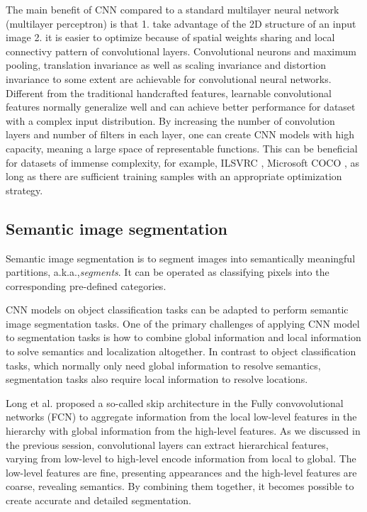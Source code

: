 
The main benefit of CNN compared to a standard multilayer neural network (multilayer perceptron) is that
1. take advantage of the 2D structure of an input image
2. it is easier to optimize because of spatial weights sharing and local connectivy pattern of convolutional layers.
Convolutional neurons and maximum pooling, translation invariance as well as scaling invariance and distortion invariance to some extent are achievable for convolutional neural networks. \cite{lecun1998gradient}
Different from the traditional handcrafted features, learnable convolutional features normally generalize well and can achieve better performance for dataset with a complex input distribution. \cite{krizhevsky2012imagenet}
By increasing the number of convolution layers and number of filters in each layer, one can create CNN models with high capacity, meaning a large space of representable functions.
This can be beneficial for datasets of immense complexity, for example, ILSVRC \cite{russakovsky2015imagenet}, Microsoft COCO \cite{lin2014microsoft}, as long as there are sufficient training samples with an appropriate optimization strategy.


\subsection{Semantic image segmentation}
\label{subsec:segmentation}


Semantic image segmentation is to segment images into semantically meaningful partitions, a.k.a.,\textit{segments}.
It can be operated as classifying pixels into the corresponding pre-defined categories.


CNN models on object classification tasks can be adapted to perform semantic image segmentation tasks. \cite{long2015fully}
One of the primary challenges of applying CNN model to segmentation tasks is how to combine global information and local information to solve semantics and localization altogether.
In contrast to object classification tasks, which normally only need global information to resolve semantics, segmentation tasks also require local information to resolve locations.


Long et al. \cite{long2015fully} proposed a so-called skip architecture in the Fully convovolutional networks (FCN) to aggregate information from the local low-level features in the hierarchy with global information from the high-level features.
As we discussed in the previous session, convolutional layers can extract hierarchical features, varying from low-level to high-level encode information from local to global.
The low-level features are fine, presenting appearances and the high-level features are coarse, revealing semantics.
By combining them together, it becomes possible to create accurate and detailed segmentation.

